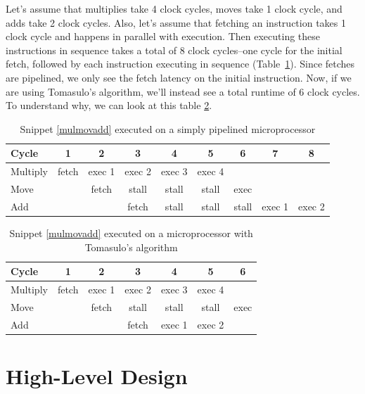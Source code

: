 \documentclass[12pt]{article}
\begin{document}
Let's assume that multiplies take 4 clock cycles, moves take 1 clock cycle, and adds take 2 clock cycles. Also, let's assume that fetching an instruction takes 1 clock cycle
and happens in parallel with execution. Then executing these instructions in sequence takes a total of 8 clock cycles--one cycle for the initial fetch, followed by each instruction
executing in sequence (Table~\ref{tab:simpleex1}). Since fetches are pipelined, we only see the fetch latency on the initial instruction. Now, if we are using Tomasulo's algorithm, we'll instead
see a total runtime of 6 clock cycles. To understand why, we can look at this table \ref{tab:tomasuloex1}.

\begin{table}
\begin{tabular}{l || c | c | c | c | c | c | c | c}
Cycle & 1 & 2 & 3 & 4 & 5 & 6  & 7 & 8 \\ \hline
Multiply & fetch & exec 1 & exec 2 & exec 3 & exec 4 & & \\
Move & & fetch & stall & stall & stall & exec & \\
Add & & & fetch & stall & stall & stall & exec 1 & exec 2 \\
\end {tabular}
\caption{Snippet \ref{mulmovadd} executed on a simply pipelined microprocessor}
\label{tab:simpleex1}
\end{table}

\begin{table}
\begin{tabular}{l || c | c | c | c | c | c}
Cycle & 1 & 2 & 3 & 4 & 5 & 6 \\ \hline
Multiply & fetch & exec 1 & exec 2 & exec 3 & exec 4 & \\
Move & & fetch & stall & stall & stall & exec \\
Add & & & fetch & exec 1 & exec 2 & \\
\end {tabular}
\caption{Snippet \ref{mulmovadd} executed on a microprocessor with Tomasulo's algorithm}
\label{tab:tomasuloex1}
\end{table}

\section{High-Level Design}
\end{document}
